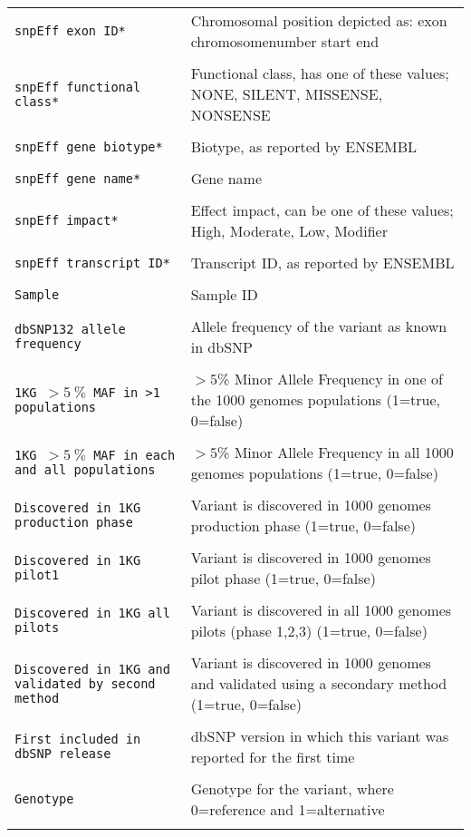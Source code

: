 \documentclass[a4paper,12pt]{article}
\begin{document}
\begin{center}
\begin{longtable}{p{5cm} p{8cm}}
	\tt{snpEff exon ID*} & Chromosomal position depicted as: exon chromosomenumber start end \\\\
	\tt{snpEff functional class*} & Functional class, has one of these values; NONE, SILENT, MISSENSE, NONSENSE \\\\
	\tt{snpEff gene biotype*} & Biotype, as reported by ENSEMBL \\\\
	\tt{snpEff gene name*} & Gene name \\\\
	\tt{snpEff impact*} & Effect impact, can be one of these values; High, Moderate, Low, Modifier \\\\
	\tt{snpEff transcript ID*} & Transcript ID, as reported by ENSEMBL \\\\
	\tt{Sample} & Sample ID \\\\
	\tt{dbSNP132 allele frequency} & Allele frequency of the variant as known in dbSNP \\\\
	\tt{1KG $>5~\%$ MAF in >1 populations} & $>5$\% Minor Allele Frequency in one of the 1000 genomes populations (1=true, 0=false) \\\\
	\tt{1KG $>5~\%$ MAF in each and all populations} & $>5$\% Minor Allele Frequency in all 1000 genomes populations (1=true, 0=false) \\\\
	\tt{Discovered in 1KG production phase} & Variant is discovered in 1000 genomes production phase (1=true, 0=false) \\\\
	\tt{Discovered in 1KG pilot1} & Variant is discovered in 1000 genomes pilot phase (1=true, 0=false) \\\\
	\tt{Discovered in 1KG all pilots} & Variant is discovered in all 1000 genomes pilots (phase 1,2,3) (1=true, 0=false) \\\\
	\tt{Discovered in 1KG and validated by second method} & Variant is discovered in 1000 genomes and validated using a secondary method (1=true, 0=false) \\\\
	\tt{First included in dbSNP release} & dbSNP version in which this variant was reported for the first time \\\\
	\tt{Genotype} & Genotype for the variant, where 0=reference and 1=alternative \\\\	\end{longtable}
\end{center}
\end{document}
